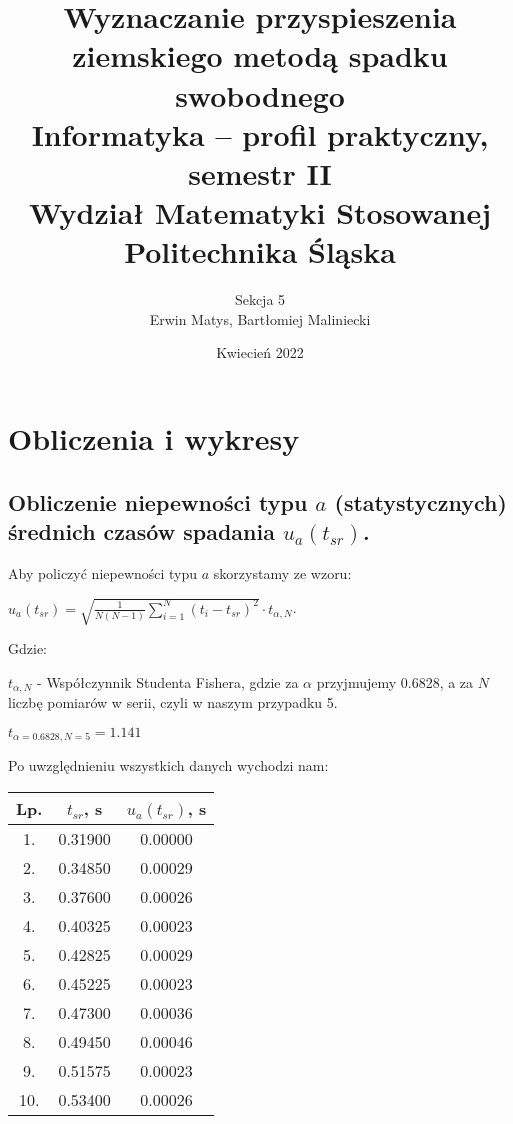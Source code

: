\documentclass[12pt]{article}
\title{ Wyznaczanie przyspieszenia ziemskiego metodą spadku swobodnego \\
    \large Informatyka – profil praktyczny, semestr II \\
    Wydział Matematyki Stosowanej \\
    Politechnika Śląska \\}
\author{ Sekcja 5 \\
    Erwin Matys, Bartłomiej Maliniecki}
\date{Kwiecień 2022}
\begin{document}
\maketitle

\section{Obliczenia i wykresy}

\subsection*{Obliczenie niepewności typu $a$ (statystycznych) średnich czasów
    spadania $u_a(t_{sr})$.} Aby policzyć niepewności typu $a$ skorzystamy ze
wzoru:
\begin{center}
    $u_a(t_{sr}) = \sqrt{\frac{1}{N(N-1)} \displaystyle\sum_{i=1}^{N} (t_i -
            t_{sr})^2} \cdot t_{\alpha, N}$.
\end{center}
Gdzie:
\begin{flushleft}
    $t_{\alpha, N}$ - Współczynnik Studenta Fishera, gdzie za $\alpha$
    przyjmujemy 0.6828, a za $N$ liczbę pomiarów w serii, czyli w naszym
    przypadku 5.
\end{flushleft}
\begin{center}
    $t_{\alpha=0.6828,N=5} = 1.141$
\end{center}
Po uwzględnieniu wszystkich danych wychodzi nam:
\begin{center}
    \begin{tabular} { | c | c | c | }
        \hline
        Lp. & $t_{sr}$, s & $u_a(t_{sr})$, s \\
        \hline
        1.  & 0.31900 & 0.00000 \\ \hline
2.  & 0.34850 & 0.00029 \\ \hline
3.  & 0.37600 & 0.00026 \\ \hline
4.  & 0.40325 & 0.00023 \\ \hline
5.  & 0.42825 & 0.00029 \\ \hline
6.  & 0.45225 & 0.00023 \\ \hline
7.  & 0.47300 & 0.00036 \\ \hline
8.  & 0.49450 & 0.00046 \\ \hline
9.  & 0.51575 & 0.00023 \\ \hline
10. & 0.53400 & 0.00026 \\ \hline
        \hline
    \end{tabular}
\end{center}
\end{document}
